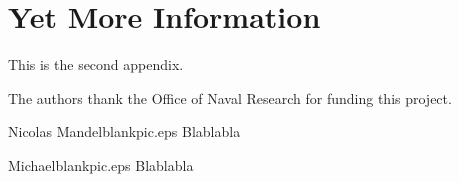 \documentclass[twocolumn,letterpaper]{IEEEAerospaceCLS}  %
\begin{document}
\section{Yet More Information}    %
This is the second appendix.



\acknowledgments
The authors thank the Office of Naval Research for funding this project.




% 


\thebiography
\begin{biographywithpic}{Nicolas Mandel}{blankpic.eps}
    Blablabla
\end{biographywithpic}

\begin{biographywithpic}{Michael}{blankpic.eps}
    Blablabla
\end{biographywithpic}
\end{document}
